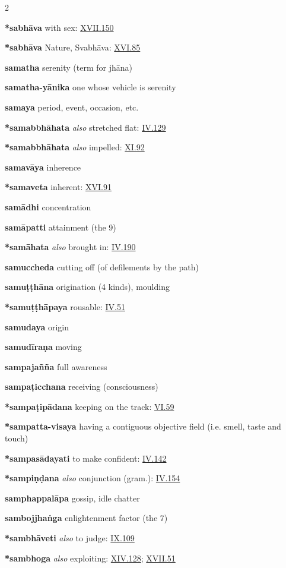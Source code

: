 \begin{multicols}{2}
\begin{vismHanging}
\par\textbf{*sabhāva} with sex: \hyperlink{XVII.150}{XVII.150}{}
\par\textbf{*sabhāva} Nature, Svabhāva: \hyperlink{XVI.85}{XVI.85}{}
\par\textbf{samatha} serenity (term for jhāna)
\par\textbf{samatha-yānika} one whose vehicle is serenity 
\par\textbf{samaya} period, event, occasion, etc.
\par\textbf{*samabbhāhata} \emph{also }stretched flat: \hyperlink{IV.129}{IV.129}{} 
\par\textbf{*samabbhāhata} \emph{also }impelled: \hyperlink{XI.92}{XI.92}{} 
\par\textbf{samavāya} inherence
\par\textbf{*samaveta} inherent: \hyperlink{XVI.91}{XVI.91}{}
\par\textbf{samādhi} concentration
\par\textbf{samāpatti} attainment (the 9)
\par\textbf{*samāhata} \emph{also }brought in: \hyperlink{IV.190}{IV.190}{}
\par\textbf{samuccheda} cutting off (of defilements by the path) 
\par\textbf{samuṭṭhāna} origination (4 kinds), moulding 
\par\textbf{*samuṭṭhāpaya} rousable: \hyperlink{IV.51}{IV.51}{}
\par\textbf{samudaya} origin
\par\textbf{samudīraṇa} moving
\par\textbf{sampajañña} full awareness
\par\textbf{sampaṭicchana} receiving (consciousness) 
\par\textbf{*sampaṭipādana} keeping on the track: \hyperlink{VI.59}{VI.59}{} 
\par\textbf{*sampatta-visaya} having a contiguous objective field (i.e. smell, taste and touch) 
\par\textbf{*sampasādayati} to make confident: \hyperlink{IV.142}{IV.142}{} 
\par\textbf{*sampiṇḍana} \emph{also }conjunction (gram.): \hyperlink{IV.154}{IV.154}{} 
\par\textbf{samphappalāpa} gossip, idle chatter
\par\textbf{sambojjhaṅga} enlightenment factor (the 7) 
\par\textbf{*sambhāveti} \emph{also }to judge: \hyperlink{IX.109}{IX.109}{}
\par\textbf{*sambhoga} \emph{also }exploiting: \hyperlink{XIV.128}{XIV.128}{}; \hyperlink{XVII.51}{XVII.51}{} 

\end{vismHanging}
\end{multicols}
